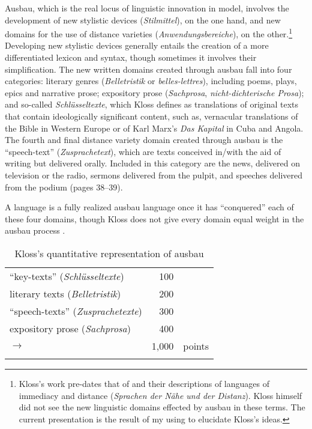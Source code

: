 Ausbau, which is the real locus of linguistic innovation in  model, involves the development of new stylistic devices (\textit{Stilmittel}), on the one hand, and new domains for the use of distance varieties (\textit{Anwendungsbereiche}), on the other.\footnote{\textrm{Kloss’s work pre-dates that of \citet{KochOesterreicher1985} and their descriptions of languages of immediacy and distance (}\textrm{\textit{Sprachen der Nähe und der Distanz}}\textrm{). Kloss himself did not see the new linguistic domains effected by ausbau in these terms. The current presentation is the result of my using \citet{KochOesterreicher1985} to elucidate Kloss’s ideas.}} Developing new stylistic devices generally entails the creation of a more differentiated lexicon and syntax, though sometimes it involves their simplification. The new written domains created through ausbau fall into four categories: literary genres (\textit{Belletristik} or \textit{belles-lettres}), including poems, plays, epics and narrative prose; expository prose (\textit{Sachprosa}, \textit{nicht-dichterische Prosa}); and so-called \textit{Schlüsseltexte}, which Kloss defines as translations of original texts that contain ideologically significant content, such as, vernacular translations of the Bible in Western Europe or of Karl Marx’s \textit{Das Kapital} in Cuba and Angola. The fourth and final distance variety domain created through ausbau is the “speech-text” (\textit{Zusprachetext}), which are texts conceived in/with the aid of writing but delivered orally. Included in this category are the news, delivered on television or the radio, sermons delivered from the pulpit, and speeches delivered from the podium (pages 38--39).

A language is a fully realized ausbau language once it has “conquered” each of these four domains, though Kloss does not give every domain equal weight in the ausbau process .

\begin{table}
\caption{Kloss's quantitative representation of ausbau}
\label{tab:4:4.1}
\begin{tabular}{lr@{~}l}
  \lsptoprule
  “key-texts” (\textit{Schlüsseltexte})   &   100  & \\
  literary texts (\textit{Belletristik})  &    200 & \\
  “speech-texts” (\textit{Zusprachetexte})&    300 & \\
  expository prose (\textit{Sachprosa})   &   400  & \\
  \midrule
                  \hfill $\to$       &         1,000 & points\\
        \lspbottomrule
\end{tabular}
\end{table}

